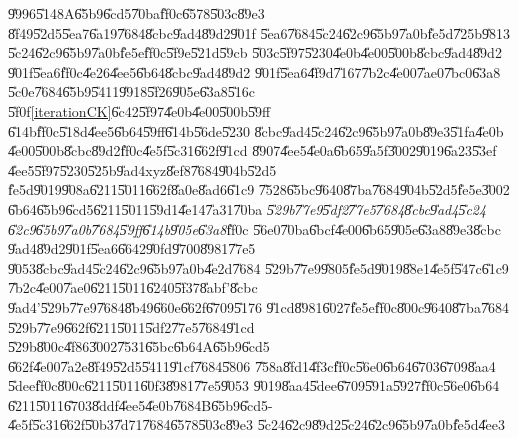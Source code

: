 \documentclass[12pt,a4paper]{article}
\begin{document}
\bigskip

\U{9996}\U{5148}A\U{65b9}\U{6cd5}\U{70ba}\U{ff0c}\U{6578}\U{503c}\U{89e3}%
\U{8f49}\U{52d5}\U{5ea7}\U{6a19}\U{7684}\U{8cbc}\U{9ad4}\U{89d2}\U{901f}%
\U{5ea6}\U{7684}\U{5c24}\U{62c9}\U{65b9}\U{7a0b}\U{fe5d}\U{725b}\U{9813}%
\U{5c24}\U{62c9}\U{65b9}\U{7a0b}\U{fe5e}\U{ff0c}\U{5f9e}\U{521d}\U{59cb}%
\U{503c}\U{5f97}\U{5230}\U{4e0b}\U{4e00}\U{500b}\U{8cbc}\U{9ad4}\U{89d2}%
\U{901f}\U{5ea6}\U{ff0c}\U{4e26}\U{4ee5}\U{6b64}\U{8cbc}\U{9ad4}\U{89d2}%
\U{901f}\U{5ea6}\U{4f9d}\U{7167}\U{7b2c}\U{4e00}\U{7ae0}\U{7bc0}\U{63a8}%
\U{5c0e}\U{7684}\U{65b9}\U{5411}\U{9918}\U{5f26}\U{905e}\U{63a8}\U{516c}%
\U{5f0f}\ref{iterationCK}\U{6c42}\U{5f97}\U{4e0b}\U{4e00}\U{500b}\U{59ff}%
\U{614b}\U{ff0c}\U{518d}\U{4ee5}\U{6b64}\U{59ff}\U{614b}\U{56de}\U{5230}%
\U{8cbc}\U{9ad4}\U{5c24}\U{62c9}\U{65b9}\U{7a0b}\U{89e3}\U{51fa}\U{4e0b}%
\U{4e00}\U{500b}\U{8cbc}\U{89d2}\U{ff0c}\U{4e5f}\U{5c31}\U{662f}\U{91cd}%
\U{8907}\U{4ee5}\U{4e0a}\U{6b65}\U{9a5f}\U{3002}\U{9019}\U{6a23}\U{53ef}%
\U{4ee5}\U{5f97}\U{5230}\U{525b}\U{9ad4}xyz\U{8ef8}\U{7684}\U{904b}\U{52d5}%
\U{fe5d}\U{9019}\U{908a}\U{6211}\U{5011}\U{662f}\U{8a0e}\U{8ad6}\U{61c9}%
\U{7528}\U{65bc}\U{9640}\U{87ba}\U{7684}\U{904b}\U{52d5}\U{fe5e}\U{3002}%
\U{6b64}\U{65b9}\U{6cd5}\U{6211}\U{5011}\U{59d1}\U{4e14}\U{7a31}\U{70ba}%
\emph{\U{529b}\U{77e9}\U{5df2}\U{77e5}\U{7684}\U{8cbc}\U{9ad4}\U{5c24}%
\U{62c9}\U{65b9}\U{7a0b}\U{7684}\U{59ff}\U{614b}\U{905e}\U{63a8}}\U{ff0c}%
\U{56e0}\U{70ba}\U{6bcf}\U{4e00}\U{6b65}\U{905e}\U{63a8}\U{89e3}\U{8cbc}%
\U{9ad4}\U{89d2}\U{901f}\U{5ea6}\U{6642}\U{90fd}\U{9700}\U{8981}\U{77e5}%
\U{9053}\U{8cbc}\U{9ad4}\U{5c24}\U{62c9}\U{65b9}\U{7a0b}\U{4e2d}\U{7684}%
\U{529b}\U{77e9}\U{9805}\U{fe5d}\U{9019}\U{88e1}\U{4e5f}\U{547c}\U{61c9}%
\U{7b2c}\U{4e00}\U{7ae0}\U{6211}\U{5011}\U{6240}\U{5f37}\U{8abf}'\U{8cbc}%
\U{9ad4}'\U{529b}\U{77e9}\U{7684}\U{8b49}\U{660e}\U{662f}\U{6709}\U{5176}%
\U{91cd}\U{8981}\U{6027}\U{fe5e}\U{ff0c}\U{800c}\U{9640}\U{87ba}\U{7684}%
\U{529b}\U{77e9}\U{662f}\U{6211}\U{5011}\U{5df2}\U{77e5}\U{7684}\U{91cd}%
\U{529b}\U{800c}\U{4f86}\U{3002}\U{7531}\U{65bc}\U{6b64}A\U{65b9}\U{6cd5}%
\U{662f}\U{4e00}\U{7a2e}\U{8f49}\U{52d5}\U{5411}\U{91cf}\U{7684}\U{5806}%
\U{758a}\U{8fd1}\U{4f3c}\U{ff0c}\U{56e0}\U{6b64}\U{6703}\U{6709}\U{8aa4}%
\U{5dee}\U{ff0c}\U{800c}\U{6211}\U{5011}\U{60f3}\U{8981}\U{77e5}\U{9053}%
\U{9019}\U{8aa4}\U{5dee}\U{6709}\U{591a}\U{5927}\U{ff0c}\U{56e0}\U{6b64}%
\U{6211}\U{5011}\U{6703}\U{8ddf}\U{4ee5}\U{4e0b}\U{7684}B\U{65b9}\U{6cd5}-%
\U{4e5f}\U{5c31}\U{662f}\U{50b3}\U{7d71}\U{7684}\U{6578}\U{503c}\U{89e3}%
\U{5c24}\U{62c9}\U{89d2}\U{5c24}\U{62c9}\U{65b9}\U{7a0b}\U{fe5d}\U{4ee3}%
\end{document}
